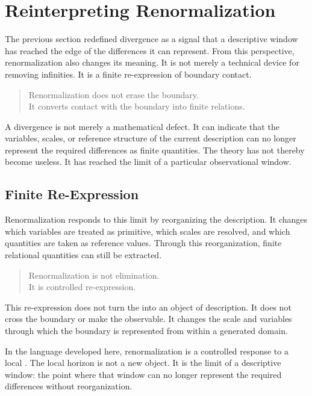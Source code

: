 \section{Reinterpreting Renormalization}

\label{sec:renorm_reinterp}

The previous section redefined divergence as a signal that a
descriptive window has reached the edge of the differences it can
represent.
From this perspective,
renormalization also changes its meaning.
It is not merely a technical device for removing infinities.
It is a finite re-expression of boundary contact.

\medskip
\begin{quote}
Renormalization does not erase the boundary.\\
It converts contact with the boundary into finite relations.
\end{quote}
\medskip

A divergence is not merely a mathematical defect.
It can indicate that the variables,
scales,
or reference structure of the current description can no longer
represent the required differences as finite quantities.
The theory has not thereby become useless.
It has reached the limit of a particular observational window.

\subsection*{Finite Re-Expression}

Renormalization responds to this limit by reorganizing the description.
It changes which variables are treated as primitive,
which scales are resolved,
and which quantities are taken as reference values.
Through this reorganization,
finite relational quantities can still be extracted.

\medskip
\begin{quote}
Renormalization is not elimination.\\
It is controlled re-expression.
\end{quote}
\medskip

This re-expression does not turn the \DH{} into an object
of description.
It does not cross the boundary or make the \ungenerated{} observable.
It changes the scale and variables through which the boundary is
represented from within a generated domain.

In the language developed here,
renormalization is a controlled response to a local \DH{}.
The local horizon is not a new object.
It is the limit of a descriptive window:
the point where that window can no longer represent the required
differences without reorganization.

